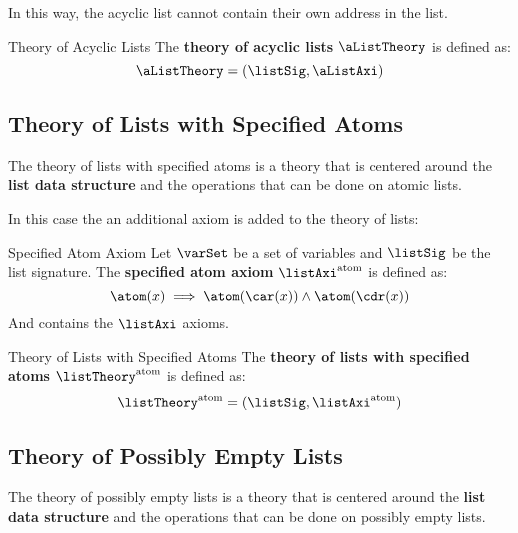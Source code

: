 In this way, the acyclic list cannot contain their own address in the list.

\begin{definition}{Theory of Acyclic Lists}
    The \textbf{theory of acyclic lists} $\aListTheory$ is defined as:
    \begin{equation*}
        \aListTheory = (\listSig,\aListAxi)
    \end{equation*}
\end{definition}

\subsection{Theory of Lists with Specified Atoms}
\label{subsec:Theory of Lists with Specified Atoms}

The theory of lists with specified atoms is a theory that is centered
around the \textbf{list data structure} and the operations that can be
done on atomic lists.

In this case the an additional axiom is added to the theory of lists:
\begin{definition}{Specified Atom Axiom}
    Let $\varSet$ be a set of variables and $\listSig$ be the list signature.
    The \textbf{specified atom axiom} $\listAxi^\text{atom}$ is defined as:
    \begin{equation*}
        \atom(x) \implies \atom(\car(x)) \land \atom(\cdr(x))
    \end{equation*}
    And contains the $\listAxi$ axioms.
\end{definition}

\begin{definition}{Theory of Lists with Specified Atoms}
    The \textbf{theory of lists with specified atoms} $\listTheory^\text{atom}$ is defined as:
    \begin{equation*}
        \listTheory^\text{atom} = (\listSig,\listAxi^\text{atom})
    \end{equation*}
\end{definition}

\subsection{Theory of Possibly Empty Lists}
\label{subsec:Theory of Possibly Empty Lists}

The theory of possibly empty lists is a theory that is centered around
the \textbf{list data structure} and the operations that can be done
on possibly empty lists.

